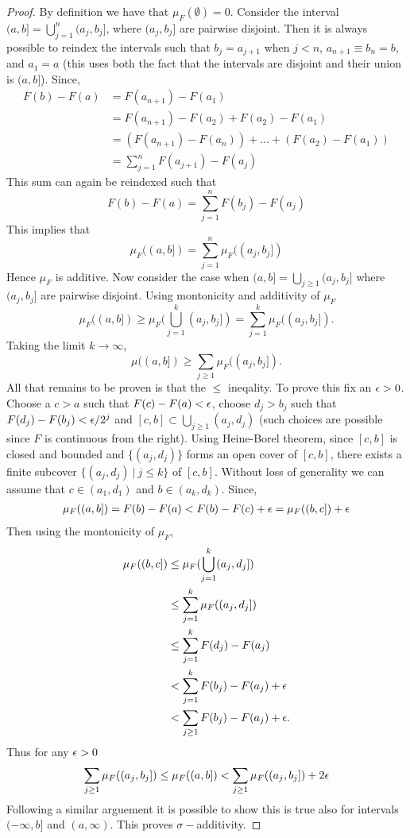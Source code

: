 \begin{proof}
  By definition we have that $\mu_F(\emptyset) = 0$. Consider the interval $(a,b] = \bigcup_{j=1}^n (a_j,b_j]$, where $(a_j,b_j]$ are pairwise disjoint. Then it is always possible to reindex the intervals such that $b_j = a_{j+1}$ when $j<n$, $a_{n+1} \equiv b_n = b$, and $a_1=a$ (this uses both the fact that the intervals are disjoint and their union is $(a,b]$). Since,
  \begin{align*}
    F(b) - F(a) &= F(a_{n+1}) - F(a_1)\\
                &= F(a_{n+1}) - F(a_2) + F(a_2) - F(a_1)\\
                &= (F(a_{n+1}) - F(a_n))+...+ (F(a_2) - F(a_1))\\
                &= \sum_{j=1}^n F(a_{j+1}) - F(a_j)
  \end{align*}
  This sum can again be reindexed such that
  \[F(b)-F(a) = \sum_{j=1}^n F(b_j) - F(a_j)\]
  This implies that
  \[\mu_F((a,b]) = \sum_{j=1}^n \mu_F((a_j,b_j])\]
  Hence $\mu_F$ is additive. Now consider the case when $(a,b] = \bigcup_{j\geq 1} (a_j,b_j]$ where $(a_j,b_j]$ are pairwise disjoint. Using montonicity and additivity of $\mu_F$
  \[\mu_F((a,b]) \geq \mu_F(\bigcup_{j=1}^k (a_j,b_j]) = \sum_{j=1}^k \mu_F((a_j,b_j]).\]
  Taking the limit $k\to\infty$,
  \[\mu((a,b]) \geq \sum_{j\geq 1} \mu_F((a_j, b_j]).\]
  All that remains to be proven is that the $\leq$ ineqality. To prove this fix an $\epsilon>0$. Choose a $c>a$ such that $F(c)-F(a)<\epsilon$, choose $d_j> b_j$ such that $F(d_j) -F(b_j) < \epsilon/2^j$ and $[c,b] \subset \bigcup_{j\geq 1} (a_j,d_j)$ (such choices are possible since $F$ is continuous from the right). Using Heine-Borel theorem, since $[c,b]$ is closed and bounded and $\{(a_j,d_j)\}$ forms an open cover of $[c,b]$, there exists a finite subcover $\{(a_j,d_j)\ |\ j\leq k\}$ of $[c,b]$. Without loss of generality we can assume that $c\in (a_1, d_1)$ and $b \in (a_k, d_k)$. Since,
  \begin{align*}
    \mu_F((a,b]) = F(b)-F(a) < F(b) - F(c) + \epsilon = \mu_F((b,c]) + \epsilon 
  \end{align*}
  Then using the montonicity of $\mu_F$,
  \begin{align*}
    \mu_F((b,c]) &\leq \mu_F(\bigcup_{j=1}^k(a_j,d_j])\\
               &\leq \sum_{j=1}^k \mu_F((a_j,d_j])\\
               &\leq \sum_{j=1}^k F(d_j) - F(a_j)\\
               &< \sum_{j=1}^k F(b_j) -F(a_j) +\epsilon\\
               &< \sum_{j\geq1} F(b_j) -F(a_j) +\epsilon.
  \end{align*}
  Thus for any $\epsilon>0$
  \[\sum_{j\geq 1} \mu_F((a_j,b_j]) \leq \mu_F((a,b]) < \sum_{j\geq 1} \mu_F((a_j,b_j]) + 2\epsilon\]
  Following a similar arguement it is possible to show this is true also for intervals $(-\infty, b]$ and $(a,\infty)$. This proves $\sigma-$additivity. 
\end{proof}
